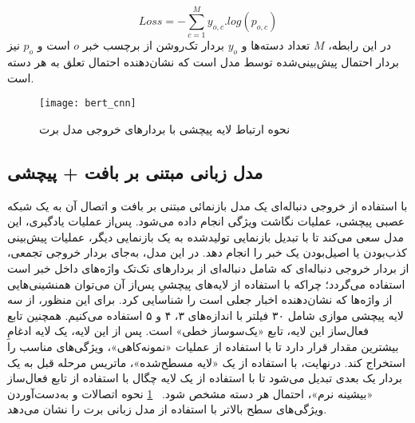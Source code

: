\begin{equation}
Loss = - \sum_{c=1}^{M}y_{o,c} . log(p_{o,c})
\end{equation}
در این رابطه، $M$ تعداد دسته‌ها و $y_o$ بردار تک‌روشن از برچسب خبر $o$ است و $p_o$ نیز بردار احتمال پیش‌بینی‌شده توسط مدل است که نشان‌دهنده احتمال تعلق به هر دسته است.


\begin{figure}[!t]
	\texttt{[image: bert\_cnn]}
	\centering
	\caption{نحوه ارتباط لایه پیچشی با بردارهای خروجی مدل برت}
	\label{fig.bertCNN}
\end{figure}

\subsection{مدل زبانی مبتنی بر بافت + پیچشی}
\label{sec:bert_cnn}
با استفاده از خروجی دنباله‌ای یک مدل‌ بازنمائی مبتنی بر بافت و اتصال آن به یک شبکه عصبی پیچشی، عملیات نگاشت ویژگی انجام داده می‌شود. پس‌از عملیات یادگیری، این مدل سعی می‌کند تا با تبدیل بازنمایی تولیدشده به یک بازنمایی دیگر، عملیات پیش‌بینی کذب‌بودن یا اصیل‌بودن یک خبر را انجام دهد. در این مدل، به‌جای بردار خروجی تجمعی، از بردار خروجی دنباله‌ای که شامل دنباله‌ای از بردارهای تک‌تک واژه‌های داخل خبر است استفاده می‌گردد؛ چراکه با استفاده از لایه‌های پیچشیِ پس‌از آن می‌توان همنشینی‌هایی از واژه‌ها که نشان‌دهنده اخبار جعلی است را شناسایی کرد. برای این منظور، از سه لایه پیچشی موازی شامل ۳۰ فیلتر با اندازه‌های ۳، ۴ و ۵ استفاده می‌کنیم. همچنین تابع فعال‌ساز این لایه، تابع «یک‌سوساز خطی» است. پس از این لایه، یک لایه ادغامِ بیشترین مقدار قرار دارد تا با استفاده از عملیات «نمونه‌کاهی»، ویژگی‌های مناسب را استخراج کند. درنهایت، با استفاده از یک «لایه مسطح‌شده»، ماتریس مرحله قبل به یک بردار یک بعدی تبدیل می‌شود تا با استفاده از یک لایه چگال با استفاده از تابع فعال‌ساز «بیشینه نرم»، احتمال هر دسته مشخص شود. \figurename~\ref{fig.bertCNN} نحوه اتصالات و به‌دست‌آوردن ویژگی‌های سطح بالاتر با استفاده از مدل زبانی برت را نشان می‌دهد.